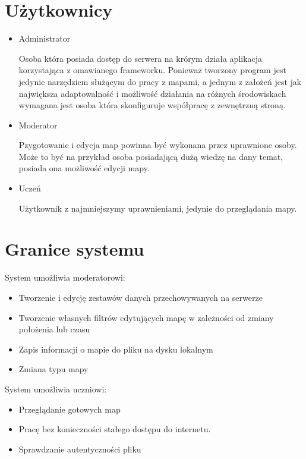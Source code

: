 \section{Użytkownicy}
\label{sec:uzytkownicy}

\begin{itemize}
\item
Administrator

Osoba która posiada dostęp do serwera na krórym działa aplikacja korzystająca z omawianego frameworku. Ponieważ tworzony program jest jedynie narzędziem służącym do pracy z mapami, a jednym z założeń jest jak największa adaptowalność i możliwość działania na różnych środowiskach wymagana jest osoba która skonfiguruje współpracę z zewnętrzną stroną.

\item
Moderator

Pzygotowanie i edycja map powinna być wykonana przez uprawnione osoby. Może to być na przykład osoba posiadającą dużą wiedzę na dany temat, posiada ona możliwość edycji mapy.
\item
Uczeń

Użytkownik z najmniejszymy uprawnieniami, jedynie do przeglądania mapy.
\end{itemize}

\section{Granice systemu}
\label{sec:granicesystemu}

System umożliwia moderatorowi:
\begin{itemize}
\item
Tworzenie i edycję zestawów danych przechowywanych na serwerze

\item
Tworzenie własnych filtrów edytujących mapę w zależności od zmiany położenia lub czasu

\item
Zapis informacji o mapie do pliku na dysku lokalnym

\item
Zmiana typu mapy

\end{itemize}

System umożliwia uczniowi:
\begin{itemize}
\item
Przeglądanie gotowych map

\item
Pracę bez konieczności stałego dostępu do internetu.

\item
Sprawdzanie autentyczności pliku

\end{itemize}

